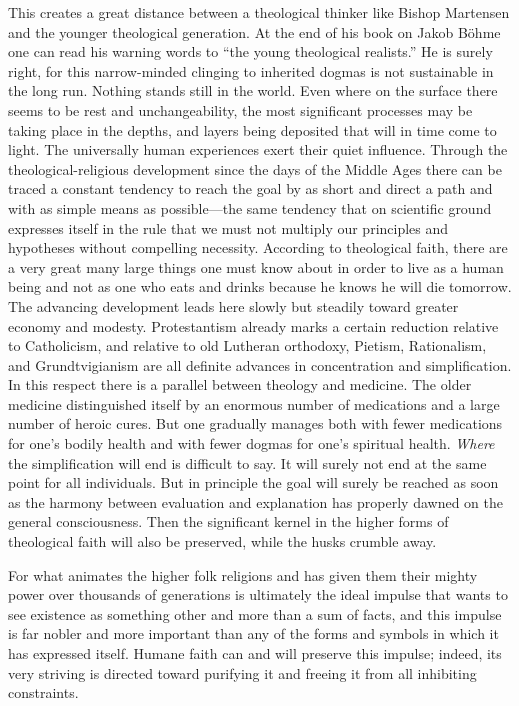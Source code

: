 \documentclass[12pt,a4paper]{article}
\newcommand{\opage}[1]{\marginnote{\footnotesize\textit{[#1]}}}
\begin{document}
\opage{13}This creates a great distance between a theological thinker like Bishop
Martensen and the younger theological generation. At the end of his book
on Jakob Böhme one can read his warning words to ``the young theological
realists.'' He is surely right, for this narrow-minded clinging to
inherited dogmas is not sustainable in the long run. Nothing stands still
in the world. Even where on the surface there seems to be rest and
unchangeability, the most significant processes may be taking place in the
depths, and layers being deposited that will in time come to light. The
universally human experiences exert their quiet influence. Through the
theological-religious development since the days of the Middle Ages there
can be traced a constant tendency to reach the goal by as short and direct
a path and with as simple means as possible---the same tendency that on
scientific ground expresses itself in the rule that we must not multiply
our principles and hypotheses without compelling necessity. According to
theological faith, there are a very great many large things one must know
about in order to live as a human being and not as one who eats and drinks
because he knows he will die tomorrow. The advancing development leads
here slowly but steadily toward greater economy and modesty.
Protestantism already marks a certain reduction relative to Catholicism,
and relative to old Lutheran orthodoxy, Pietism, Rationalism, and
Grundtvigianism are all definite advances in concentration and
simplification. In this respect there is a parallel between theology and
medicine. The older medicine distinguished itself by an enormous number
of medications and a large number of heroic cures. But one gradually
manages both with fewer medications for one's bodily health and with fewer
dogmas for one's spiritual health. \emph{Where} the simplification will end is
difficult to say. It will surely not end at the same point for all
individuals. But in principle the goal will surely be reached as soon as
the harmony between evaluation and explanation has properly dawned on the
general consciousness. Then the significant kernel in the higher forms of
theological faith will also be preserved, \opage{14}while the husks crumble away.

For what animates the higher folk religions and has given them their
mighty power over thousands of generations is ultimately the ideal impulse
that wants to see existence as something other and more than a sum of
facts, and this impulse is far nobler and more important than any of the
forms and symbols in which it has expressed itself. Humane faith can and
will preserve this impulse; indeed, its very striving is directed toward
purifying it and freeing it from all inhibiting constraints.
\end{document}
